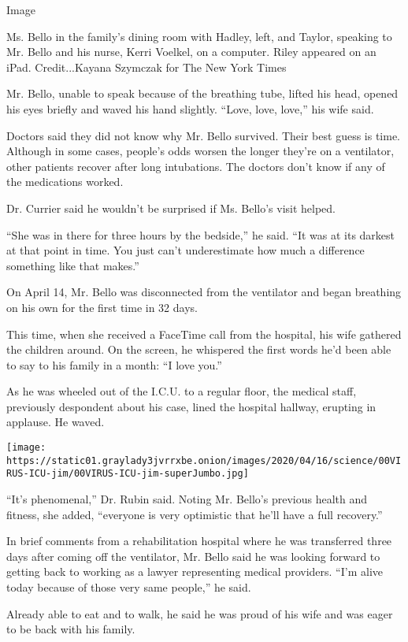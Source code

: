 Image

Ms. Bello in the family's dining room with Hadley, left, and Taylor,
speaking to Mr. Bello and his nurse, Kerri Voelkel, on a computer. Riley
appeared on an iPad. Credit...Kayana Szymczak for The New York Times

Mr. Bello, unable to speak because of the breathing tube, lifted his
head, opened his eyes briefly and waved his hand slightly. ``Love, love,
love,'' his wife said.

Doctors said they did not know why Mr. Bello survived. Their best guess
is time. Although in some cases, people's odds worsen the longer they're
on a ventilator, other patients recover after long intubations. The
doctors don't know if any of the medications worked.

Dr. Currier said he wouldn't be surprised if Ms. Bello's visit helped.

``She was in there for three hours by the bedside,'' he said. ``It was
at its darkest at that point in time. You just can't underestimate how
much a difference something like that makes.''

On April 14, Mr. Bello was disconnected from the ventilator and began
breathing on his own for the first time in 32 days.

This time, when she received a FaceTime call from the hospital, his wife
gathered the children around. On the screen, he whispered the first
words he'd been able to say to his family in a month: ``I love you.''

As he was wheeled out of the I.C.U. to a regular floor, the medical
staff, previously despondent about his case, lined the hospital hallway,
erupting in applause. He waved.

\texttt{[image: https://static01.graylady3jvrrxbe.onion/images/2020/04/16/science/00VIRUS-ICU-jim/00VIRUS-ICU-jim-superJumbo.jpg]}

``It's phenomenal,'' Dr. Rubin said. Noting Mr. Bello's previous health
and fitness, she added, ``everyone is very optimistic that he'll have a
full recovery.''

In brief comments from a rehabilitation hospital where he was
transferred three days after coming off the ventilator, Mr. Bello said
he was looking forward to getting back to working as a lawyer
representing medical providers. ``I'm alive today because of those very
same people,'' he said.

Already able to eat and to walk, he said he was proud of his wife and
was eager to be back with his family.

